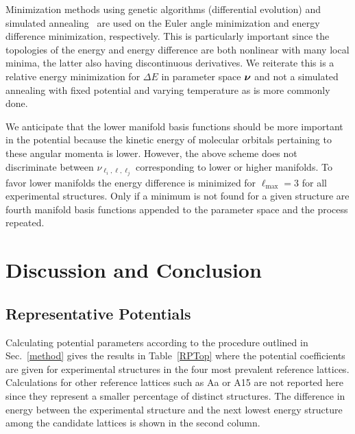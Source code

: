 \documentclass[preprint]{revtex4}
\newcommand{\mb}[1]{\ensuremath{\mbox{\boldmath $ #1 $}}}
\begin{document}
Minimization methods using genetic algorithms (differential
evolution) and simulated annealing~\cite{Kirkpatrick83} are used on
the Euler angle minimization and energy difference minimization,
respectively. This is particularly important since the topologies of
the energy and energy difference are both nonlinear with many local
minima, the latter also having discontinuous derivatives. We
reiterate this is a relative energy minimization for $\Delta E$ in
parameter space $\mb{\nu}$ and not a simulated annealing with fixed
potential and varying temperature as is more commonly done.

We anticipate that the lower manifold basis functions should be more
important in the potential because the kinetic energy of molecular
orbitals pertaining to these angular momenta is lower. However, the
above scheme does not discriminate between
$\nu_{\ell_i,\ell,\ell_j}$ corresponding to lower or higher
manifolds.  To favor lower manifolds the energy difference is
minimized for $\ell_{\mathrm{max}}=3$ for all experimental
structures. Only if a minimum is not found for a given structure are
fourth manifold basis functions appended to the parameter space and
the process repeated.


\section{Discussion and Conclusion}
\label{discussion}

\subsection{Representative Potentials}
\label{representative_potentials}

Calculating potential parameters according to the procedure outlined
in Sec.~\ref{method} gives the results in Table~\ref{RPTop} where
the potential coefficients are given for experimental structures in
the four most prevalent reference lattices. Calculations for other
reference lattices such as Aa or A15 are not reported here since
they represent a smaller percentage of distinct structures. The
difference in energy between the experimental structure and the next
lowest energy structure among the candidate lattices is shown in the
second column.
\end{document}
